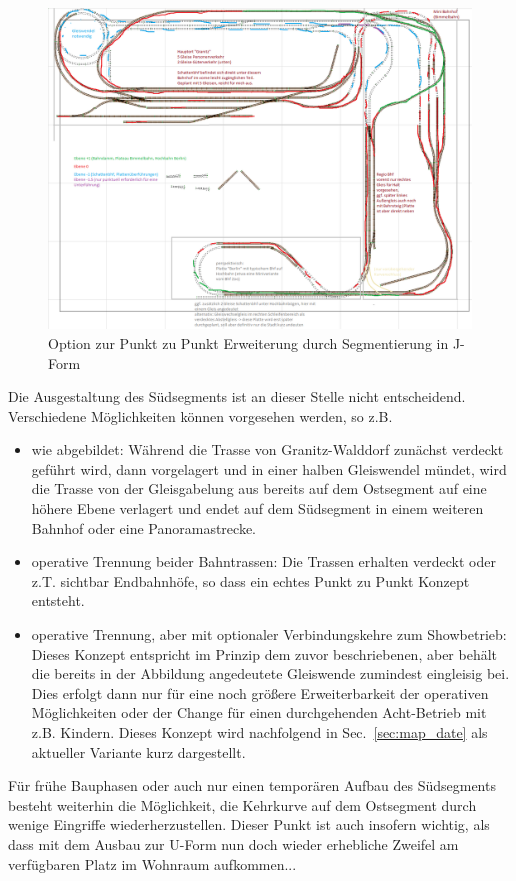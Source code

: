 \begin{figure}[h]
\centering
  \includegraphics[width=1.0\textwidth]{img/map_evolution/state3_granitz_modules.png}
	\caption{Option zur Punkt zu Punkt Erweiterung durch Segmentierung in J-Form}
	\label{img:state3_granitz_modules}
\end{figure}

Die Ausgestaltung des S\"udsegments ist an dieser Stelle nicht entscheidend.
Verschiedene M\"oglichkeiten k\"onnen vorgesehen werden, so z.B.
\begin{itemize}
	\item wie abgebildet:
	W\"ahrend die Trasse von Granitz-Walddorf zun\"achst verdeckt gef\"uhrt wird, dann vorgelagert und in einer halben Gleiswendel m\"undet, wird die Trasse von der Gleisgabelung aus bereits auf dem Ostsegment auf eine h\"ohere Ebene verlagert und endet auf dem S\"udsegment in einem weiteren Bahnhof oder eine Panoramastrecke.
	\item operative Trennung beider Bahntrassen:
	Die Trassen erhalten verdeckt oder z.T. sichtbar Endbahnh\"ofe, so dass ein echtes Punkt zu Punkt Konzept entsteht.
	\item operative Trennung, aber mit optionaler Verbindungskehre zum Showbetrieb:
	Dieses Konzept entspricht im Prinzip dem zuvor beschriebenen, aber beh\"alt die bereits in der Abbildung angedeutete Gleiswende zumindest eingleisig bei.
	Dies erfolgt dann nur f\"ur eine noch gr\"o{\ss}ere Erweiterbarkeit der operativen M\"oglichkeiten oder der Change f\"ur einen durchgehenden Acht-Betrieb mit z.B. Kindern.
	Dieses Konzept wird nachfolgend in Sec.~\ref{sec:map_date} als aktueller Variante kurz dargestellt.
\end{itemize}
F\"ur fr\"uhe Bauphasen oder auch nur einen tempor\"aren Aufbau des S\"udsegments besteht weiterhin die M\"oglichkeit, die Kehrkurve auf dem Ostsegment durch wenige Eingriffe wiederherzustellen.
Dieser Punkt ist auch insofern wichtig, als dass mit dem Ausbau zur U-Form nun doch wieder erhebliche Zweifel am verf\"ugbaren Platz im Wohnraum aufkommen...

